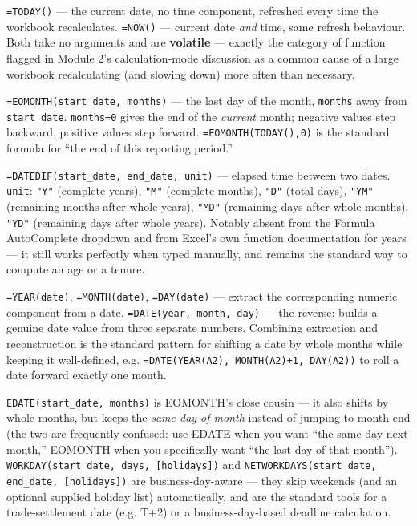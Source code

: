 \documentclass[11pt,a4paper]{article}
\begin{document}
\begin{formulasyntax}
\texttt{=TODAY()} --- the current date, no time component, refreshed every time the workbook recalculates. \texttt{=NOW()} --- current date \emph{and} time, same refresh behaviour. Both take no arguments and are \textbf{volatile} --- exactly the category of function flagged in Module 2's calculation-mode discussion as a common cause of a large workbook recalculating (and slowing down) more often than necessary.
\end{formulasyntax}

\begin{formulasyntax}[EOMONTH]
\texttt{=EOMONTH(start\_date, months)} --- the last day of the month, \texttt{months} away from \texttt{start\_date}. \texttt{months=0} gives the end of the \emph{current} month; negative values step backward, positive values step forward. \texttt{=EOMONTH(TODAY(),0)} is the standard formula for ``the end of this reporting period.''
\end{formulasyntax}

\begin{formulasyntax}[DATEDIF]
\texttt{=DATEDIF(start\_date, end\_date, unit)} --- elapsed time between two dates. \texttt{unit}: \texttt{"Y"} (complete years), \texttt{"M"} (complete months), \texttt{"D"} (total days), \texttt{"YM"} (remaining months after whole years), \texttt{"MD"} (remaining days after whole months), \texttt{"YD"} (remaining days after whole years). Notably absent from the Formula AutoComplete dropdown and from Excel's own function documentation for years --- it still works perfectly when typed manually, and remains the standard way to compute an age or a tenure.
\end{formulasyntax}

\begin{formulasyntax}
\texttt{=YEAR(date)}, \texttt{=MONTH(date)}, \texttt{=DAY(date)} --- extract the corresponding numeric component from a date. \texttt{=DATE(year, month, day)} --- the reverse: builds a genuine date value from three separate numbers. Combining extraction and reconstruction is the standard pattern for shifting a date by whole months while keeping it well-defined, e.g. \texttt{=DATE(YEAR(A2), MONTH(A2)+1, DAY(A2))} to roll a date forward exactly one month.
\end{formulasyntax}

\begin{protip}
\texttt{EDATE(start\_date, months)} is EOMONTH's close cousin --- it also shifts by whole months, but keeps the \emph{same day-of-month} instead of jumping to month-end (the two are frequently confused: use EDATE when you want ``the same day next month,'' EOMONTH when you specifically want ``the last day of that month''). \texttt{WORKDAY(start\_date, days, [holidays])} and \texttt{NETWORKDAYS(start\_date, end\_date, [holidays])} are business-day-aware --- they skip weekends (and an optional supplied holiday list) automatically, and are the standard tools for a trade-settlement date (e.g. T+2) or a business-day-based deadline calculation.
\end{protip}
\end{document}
